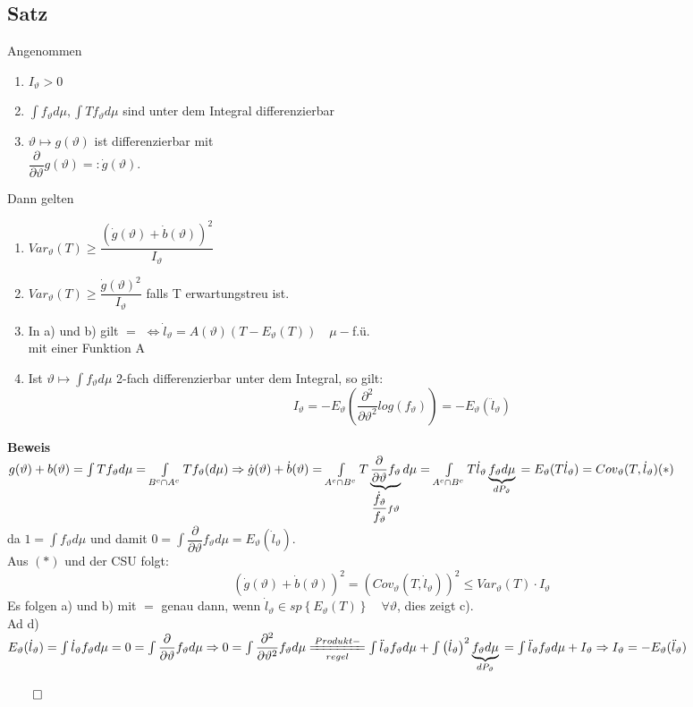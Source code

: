 \documentclass[german,10pt,oneside, fleqn, a4paper]{article}
\newcommand{\Ra}	{\Rightarrow}
\newcommand{\LRa}{\Leftrightarrow}
\newcommand{\brc}[1]{\left(#1\right)}
\newcommand{\brac}[1]{\left\lbrace #1\right\rbrace}
\newcommand{\QED}{\begin{flushright}$\qed$\end{flushright}}
\newcommand{\beweis}{\textbf{Beweis}\\}
\newcommand{\1}[1]{1_{#1}}
\newcommand{\2}[1]{\1{\brac{#1}}}
\newcommand{\qf}{\quad\forall}
\begin{document}
\subsection{Satz}
\label{13.3}
Angenommen \begin{enumerate}[label=(\roman*)]
\item $I_\vartheta>0$
\item $\int f_\vartheta d\mu, \int Tf_\vartheta d\mu$ sind unter dem Integral differenzierbar
\item $\vartheta\mapsto g(\vartheta)$ ist differenzierbar mit \\
$\dfrac{\partial}{\partial\vartheta}g(\vartheta)=:\dot g(\vartheta).$
\end{enumerate}
Dann gelten\begin{enumerate}[label=(\alph*)]
\item $Var_\vartheta(T)\geq\dfrac{(\dot g(\vartheta)+\dot b(\vartheta))^2}{I_\vartheta}$
\item $Var_\vartheta(T)\geq \dfrac{\dot g(\vartheta)^2}{I_\vartheta}$ falls T erwartungstreu ist.
\item In a) und b) gilt \glqq $=$ \grqq$\LRa \dot l_\vartheta=A(\vartheta)(T-E_\vartheta(T))\quad\mu-$f.ü. \\mit einer Funktion A
\item Ist $\vartheta\mapsto\int f_\vartheta d\mu$ 2-fach differenzierbar unter dem Integral, so gilt:\[
I_\vartheta=-E_\vartheta\brc{\dfrac{\partial^2}{\partial\vartheta^2}log(f_\vartheta)}=-E_\vartheta(\ddot l_\vartheta)\]
\end{enumerate}
\beweis
$g(\vartheta)+b(\vartheta)=\int Tf_\vartheta d\mu=\int\limits_{B^c\cap A^c}Tf_\vartheta(d\mu)\\
\Ra \dot{g}(\vartheta)+\dot b(\vartheta)=\int\limits_{A^c\cap B^c}T\underbrace{\dfrac{\partial}{\partial\vartheta}f_\vartheta}_{\dfrac{\dot f_\vartheta}{f_\vartheta}f\vartheta}d\mu=\int\limits_{A^c\cap B^c} T\dot l_\vartheta \underbrace{f_\vartheta d\mu}_{dP_\vartheta}\\
=E_\vartheta(T\dot l_\vartheta)=Cov_\vartheta(T,\dot l_\vartheta)\hfill (*)$\\
da $1=\int f_\vartheta d\mu$ und damit $0=\int\dfrac{\partial}{\partial\vartheta}f_\vartheta d\mu=E_\vartheta(\dot l_\vartheta)$.\\
Aus $(*)$ und der CSU folgt:\[
\brc{\dot g(\vartheta)+\dot b(\vartheta)}^2=\brc{Cov_\vartheta(T,\dot l_\vartheta)}^2\leq Var_\vartheta(T)\cdot I_\vartheta\]
Es folgen a) und b) mit \glqq $=$ \grqq genau dann, wenn $\dot l_\vartheta\in sp\brac{E_\vartheta(T)}\qf \vartheta$, dies zeigt c).\\
Ad d)\\
$E_\vartheta(\dot l_\vartheta)=\int \dot l_\vartheta f_\vartheta d\mu=0=\int\dfrac{\partial}{\partial\vartheta}f_\vartheta d\mu\\
\Ra 0=\int\dfrac{\partial^2}{\partial\vartheta^2}f_\vartheta d\mu\xlongequal[regel]{Produkt-}\int\ddot l_\vartheta f_\vartheta d\mu+\int \brc{\dot l_\vartheta}^2\underbrace{f_\vartheta d\mu}_{dP_\vartheta}\\
=\int\ddot l_\vartheta f_\vartheta d\mu+I_\vartheta\\
\Ra I_\vartheta=-E_\vartheta(\ddot l_\vartheta)$\QED
\end{document}
